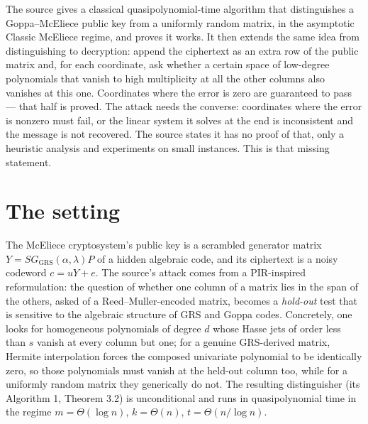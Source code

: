 \documentclass{aicr-conjecture}
\newcommand{\GRS}{\mathrm{GRS}}
\begin{document}

\vspace{0.4em}

\begin{informalconjecture}
The source gives a classical quasipolynomial-time algorithm that
distinguishes a Goppa--McEliece public key from a uniformly random
matrix, in the asymptotic Classic McEliece regime, and proves it works.
It then extends the same idea from distinguishing to decryption: append
the ciphertext as an extra row of the public matrix and, for each
coordinate, ask whether a certain space of low-degree polynomials that
vanish to high multiplicity at all the other columns also vanishes at
this one. Coordinates where the error is zero are guaranteed to pass ---
that half is proved. The attack needs the converse: coordinates where the
error is nonzero must fail, or the linear system it solves at the end is
inconsistent and the message is not recovered. The source states it has
no proof of that, only a heuristic analysis and experiments on small
instances. This is that missing statement.
\end{informalconjecture}

\section{The setting}\label{sec:setting}

The McEliece cryptosystem's public key is a scrambled generator matrix
$Y = SG_{\GRS}(\alpha,\lambda)P$ of a hidden algebraic code, and its
ciphertext is a noisy codeword $c = uY + e$. The source's attack comes
from a PIR-inspired reformulation: the question of whether one column of
a matrix lies in the span of the others, asked of a Reed--Muller-encoded
matrix, becomes a \emph{hold-out} test that is sensitive to the algebraic
structure of GRS and Goppa codes. Concretely, one looks for homogeneous
polynomials of degree $d$ whose Hasse jets of order less than $s$ vanish
at every column but one; for a genuine GRS-derived matrix, Hermite
interpolation forces the composed univariate polynomial to be identically
zero, so those polynomials must vanish at the held-out column too, while
for a uniformly random matrix they generically do not. The resulting
distinguisher (its Algorithm 1, Theorem 3.2) is unconditional and runs in
quasipolynomial time in the regime $m = \Theta(\log n)$, $k = \Theta(n)$,
$t = \Theta(n/\log n)$.
\end{document}
